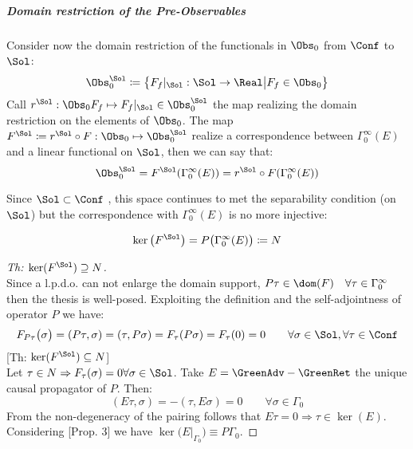 \documentclass[Main]{subfiles}
\begin{document}
			\subparagraph{Domain restriction of the Pre-Observables} 
			  		
				Consider now the domain restriction of the functionals in $\Obs_0$ from $\Conf$ to $\Sol$:
   					\begin{displaymath}
   						\Obs_0^\Sol \coloneqq \big\{F_f\vert_\Sol : \Sol \rightarrow \Real \big \vert F_f \in \Obs_0 \big\}
   					\end{displaymath}
				Call $r^\Sol : \Obs_0 F_f \mapsto F_f \vert_\Sol \in \Obs_0^\Sol$ the map realizing the domain restriction on the elements of $\Obs_0$.
				The map $F^\Sol \coloneqq r^\Sol \circ F : \Obs_0 \mapsto \Obs_0^\Sol $ realize a correspondence between $\Gamma_0^\infty(E)$ and a linear functional on $\Sol$, then we can say that:
				\begin{displaymath}
					\Obs_0^\Sol = F^\Sol ( \Gamma_0^\infty(E)) = r^\Sol \circ F (\Gamma_0^\infty(E)) 
				\end{displaymath}				   					
   					
   				Since $\Sol \subset \Conf$ , this space continues to met the separability condition (on $\Sol$) but the correspondence with  $\Gamma_0^\infty(E)$ is no more injective:
					\begin{proposition}
						\begin{displaymath}
							\ker \big( F^\Sol \big) = P \big( \Gamma_0^\infty (E) \big)	\coloneqq N	
						\end{displaymath}
					\end{proposition}
					\begin{proof}
					[Th: $\ker(F^\Sol) \supseteq N$]\\
					Since a l.p.d.o. can not enlarge the domain support, $ P \tau \in \dom(F) \quad \forall \tau \in \Gamma_0^\infty$ then the thesis is well-posed.
					Exploiting the definition and the self-adjointness of operator $P$ we have:
					\begin{displaymath}
						F_{P\tau} \big( \sigma \big) = ( P\tau, \sigma) = (\tau, P\sigma) = F_\tau (P\sigma)= F_\tau(0) = 0 \qquad \forall \sigma \in \Sol, \forall \tau \in \Conf
					\end{displaymath}
					[Th: $\ker(F^\Sol) \subseteq N$]\\			
					Let $	\tau \in N \Rightarrow F_\tau (\sigma) =0 \forall \sigma \in \Sol$.
					Take $E= \GreenAdv- \GreenRet$	 the unique causal propagator of $P$.
					Then:
					\begin{displaymath}
						(E \tau , \sigma) = - (\tau , E \sigma) = 0 \qquad \forall \sigma \in \Gamma_0
					\end{displaymath}								
					From the non-degeneracy of the pairing follows that $E\tau = 0 \Rightarrow  \tau \in \ker(E)$.
					Considering \cite{Benini}[Prop. 3] we have $ \ker \big(E\big\vert_{\Gamma_0} \big) \equiv P \Gamma_0$.
					\end{proof}
   			
\end{document}
